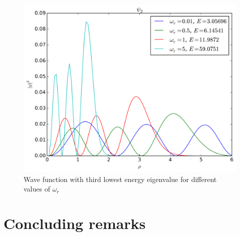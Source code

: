 \documentclass[11pt,a4paper,english,draft]{article}
\numberwithin{equation}{section}
\newcommand{\figurewidth}{.85\textwidth}
\begin{document}
\begin{figure}
\centering
\includegraphics[width=\figurewidth]{../results/psi_compare_omegar2.png}
\caption{Wave function with third lowest energy eigenvalue
for different values of $\omega_r$}
\label{fig:omegar2}
\end{figure}


\section{Concluding remarks }
\end{document}
